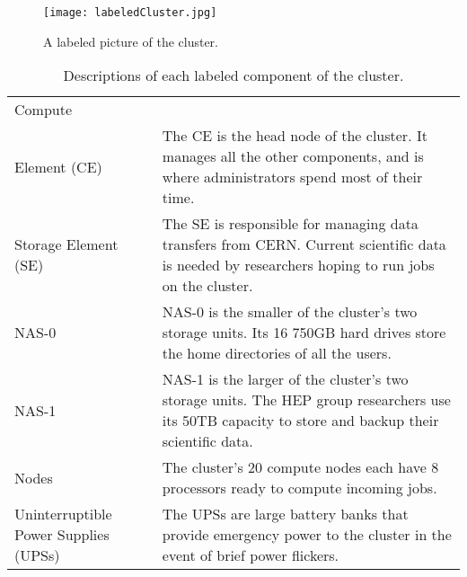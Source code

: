 \documentclass[12pt]{article}
\begin{document}
\begin{multicols}{2}

\begin{figure}[H]
  \begin{center}
    \texttt{[image: labeledCluster.jpg]}
  \end{center}
  \caption{A labeled picture of the cluster.}
  \label{pic:labeledCluster}
\end{figure}

\columnbreak

\begin{table}[H]
  \caption{Descriptions of each labeled component of the cluster.}
  \begin{center}
    \begin{tabular}{|p{3cm}|p{5cm}|}
      \hline
      Compute\\ Element (CE) & The CE is the head node of the cluster. It manages
                             all the other components, and is where
                             administrators spend most of their time. \\
      \hline
      Storage Element (SE) & The SE is responsible for managing data transfers
                             from CERN. Current scientific data is needed by
                             researchers hoping to run jobs on the cluster. \\
      \hline
      NAS-0 & NAS-0 is the smaller of the cluster's two storage units. Its 16
              750GB hard drives store the home directories of all the users. \\
      \hline
      NAS-1 & NAS-1 is the larger of the cluster's two storage units. The HEP
              group researchers use its 50TB capacity to store and backup their
              scientific data. \\
      \hline
      Nodes & The cluster's 20 compute nodes each have 8 processors ready to
              compute incoming jobs. \\
      \hline
      Uninterruptible Power Supplies (UPSs) & The UPSs are large battery banks
                                              that provide emergency power to
                                              the cluster in the event of brief
                                              power flickers. \\
      \hline
    \end{tabular}
  \end{center}
\end{table}

\end{multicols}
\end{document}
